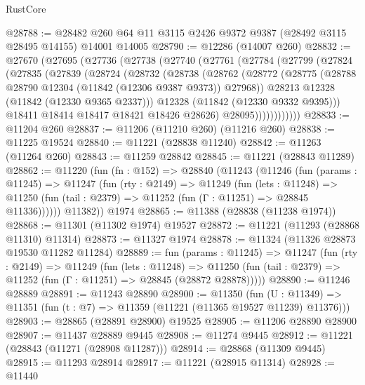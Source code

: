 \begin{lexlean}{RustCore}
\begin{coremodule}
@28788 := @28482 @260 @64 @11 @3115 @2426 @9372 @9387 (@28492 @3115 @28495 @14155) @14001 @14005
@28790 := @12286 (@14007 @260)
@28832 := @27670
    (@27695
      (@27736
        (@27738
          (@27740
            (@27761
              (@27784
                (@27799
                  (@27824
                    (@27835
                      (@27839
                        (@28724
                          (@28732
                            (@28738
                              (@28762
                                (@28772
                                  (@28775
                                    (@28788 @28790 @12304 (@11842 (@12306 @9387 @9373)) @27968))
                                  @28213
                                  @12328
                                  (@11842 (@12330 @9365 @2337)))
                                @12328
                                (@11842 (@12330 @9332 @9395)))
                              @18411
                              @18414
                              @18417
                              @18421
                              @18426
                              @28626)
                            @28095))))))))))))
@28833 := @11204 @260
@28837 := @11206 (@11210 @260) (@11216 @260)
@28838 := @11225 @19524
@28840 := @11221 (@28838 @11240)
@28842 := @11263 (@11264 @260)
@28843 := @11259 @28842
@28845 := @11221 (@28843 @11289)
@28862 := @11220
    (fun (fn : @152) =>
    @28840
      (@11243
        (@11246
          (fun (params : @11245) =>
          @11247
            (fun (rty : @2149) =>
            @11249
              (fun (lets : @11248) =>
              @11250 (fun (tail : @2379) => @11252 (fun (Γ : @11251) => @28845 @11336))))))
        @11382))
    @1974
@28865 := @11388 (@28838 (@11238 @1974))
@28868 := @11301 (@11302 @1974) @19527
@28872 := @11221 (@11293 (@28868 @11310) @11314)
@28873 := @11327 @1974
@28878 := @11324 (@11326 @28873 @19530 @11282 @11284)
@28889 := fun (params : @11245) =>
  @11247
    (fun (rty : @2149) =>
    @11249
      (fun (lets : @11248) =>
      @11250 (fun (tail : @2379) => @11252 (fun (Γ : @11251) => @28845 (@28872 @28878)))))
@28890 := @11246 @28889
@28891 := @11243 @28890
@28900 := @11350
    (fun (U : @11349) => @11351 (fun (t : @7) => @11359 (@11221 (@11365 @19527 @11239) @11376)))
@28903 := @28865 (@28891 @28900) @19525
@28905 := @11206 @28890 @28900
@28907 := @11437 @28889 @9445
@28908 := @11274 @9445
@28912 := @11221 (@28843 (@11271 (@28908 @11287)))
@28914 := @28868 (@11309 @9445)
@28915 := @11293 @28914
@28917 := @11221 (@28915 @11314)
@28928 := @11440

\end{coremodule}
\end{lexlean}

